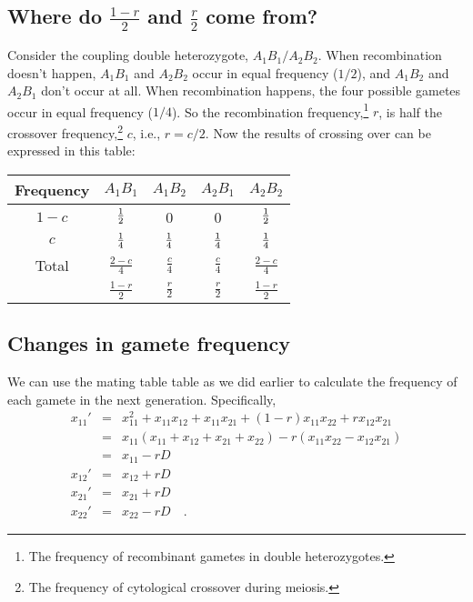 \documentclass[12pt]{article}
\begin{document}
\subsection*{Where do $\frac{1-r}{2}$ and $\frac{r}{2}$ come from?}

Consider the coupling double heterozygote, $A_1B_1/A_2B_2$. When
recombination doesn't happen, $A_1B_1$ and $A_2B_2$ occur in equal
frequency ($1/2$), and $A_1B_2$ and $A_2B_1$ don't occur at all. When
recombination happens, the four possible gametes occur in equal
frequency ($1/4$). So the recombination frequency,\footnote{The
  frequency of recombinant gametes in double heterozygotes.} $r$, is
half the crossover frequency,\footnote{The frequency of cytological
  crossover during meiosis.} $c$, i.e., $r = c/2$. Now the results of
crossing over can be expressed in this table:

\begin{center}
\begin{tabular}{c|cccc}
\hline\hline
Frequency & $A_1B_1$ & $A_1B_2$ & $A_2B_1$ & $A_2B_2$ \\
\hline
$1-c$     & $\frac{1}{2}$  & 0        & 0        & $\frac{1}{2}$ \\
$c$       & $\frac{1}{4}$ & $\frac{1}{4}$ & $\frac{1}{4}$ & $\frac{1}{4}$ \\
\hline
Total     & $\frac{2-c}{4}$ & $\frac{c}{4}$ & $\frac{c}{4}$
          & $\frac{2-c}{4}$ \\
          & $\frac{1-r}{2}$ & $\frac{r}{2}$ & $\frac{r}{2}$
          & $\frac{1-r}{2}$ \\
\hline
\end{tabular}
\end{center}

\subsection*{Changes in gamete frequency}

We can use the mating table table as we did earlier to calculate the
frequency of each gamete in the next generation. Specifically,
\begin{eqnarray*}
x_{11}' &=& x_{11}^2 + x_{11}x_{12} + x_{11}x_{21} + (1-r)x_{11}x_{22}
            + rx_{12}x_{21} \\
        &=& x_{11}(x_{11} + x_{12} + x_{21} + x_{22})
            - r(x_{11}x_{22} - x_{12}x_{21}) \\
        &=& x_{11} - rD \\
x_{12}' &=& x_{12} + rD \\
x_{21}' &=& x_{21} + rD \\
x_{22}' &=& x_{22} - rD \quad .
\end{eqnarray*}
\end{document}
